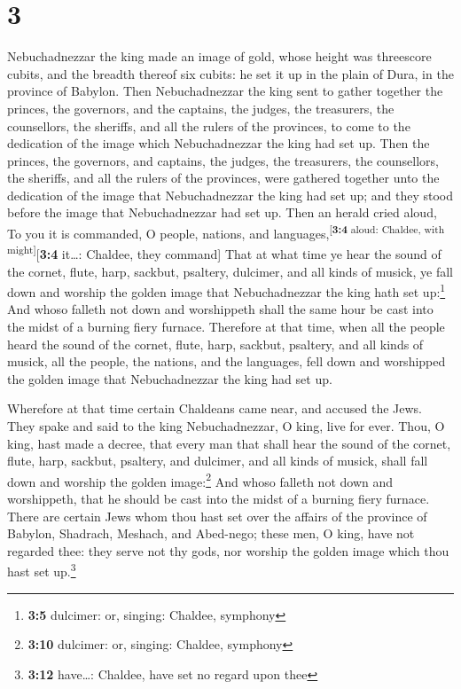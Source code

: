 \hypertarget{section-2}{%
\section{3}\label{section-2}}

 Nebuchadnezzar the king made an image of gold, whose
height was threescore cubits, and the breadth thereof six cubits: he set
it up in the plain of Dura, in the province of Babylon. 
Then Nebuchadnezzar the king sent to gather together the princes, the
governors, and the captains, the judges, the treasurers, the
counsellors, the sheriffs, and all the rulers of the provinces, to come
to the dedication of the image which Nebuchadnezzar the king had set up.
 Then the princes, the governors, and captains, the
judges, the treasurers, the counsellors, the sheriffs, and all the
rulers of the provinces, were gathered together unto the dedication of
the image that Nebuchadnezzar the king had set up; and they stood before
the image that Nebuchadnezzar had set up.  Then an herald
cried aloud, To you it is commanded, O people, nations, and
languages,\textsuperscript{{[}\textbf{3:4} aloud: Chaldee, with
might{]}}{[}\textbf{3:4} it\ldots: Chaldee, they command{]}
 That at what time ye hear the sound of the cornet, flute,
harp, sackbut, psaltery, dulcimer, and all kinds of musick, ye fall down
and worship the golden image that Nebuchadnezzar the king hath set
up:\footnote{\textbf{3:5} dulcimer: or, singing: Chaldee, symphony}
 And whoso falleth not down and worshippeth shall the same
hour be cast into the midst of a burning fiery furnace. 
Therefore at that time, when all the people heard the sound of the
cornet, flute, harp, sackbut, psaltery, and all kinds of musick, all the
people, the nations, and the languages, fell down and worshipped the
golden image that Nebuchadnezzar the king had set up.

 Wherefore at that time certain Chaldeans came near, and
accused the Jews.  They spake and said to the king
Nebuchadnezzar, O king, live for ever.  Thou, O king,
hast made a decree, that every man that shall hear the sound of the
cornet, flute, harp, sackbut, psaltery, and dulcimer, and all kinds of
musick, shall fall down and worship the golden image:\footnote{\textbf{3:10}
  dulcimer: or, singing: Chaldee, symphony}  And whoso
falleth not down and worshippeth, that he should be cast into the midst
of a burning fiery furnace.  There are certain Jews whom
thou hast set over the affairs of the province of Babylon, Shadrach,
Meshach, and Abed-nego; these men, O king, have not regarded thee: they
serve not thy gods, nor worship the golden image which thou hast set
up.\footnote{\textbf{3:12} have\ldots: Chaldee, have set no regard upon
  thee}

